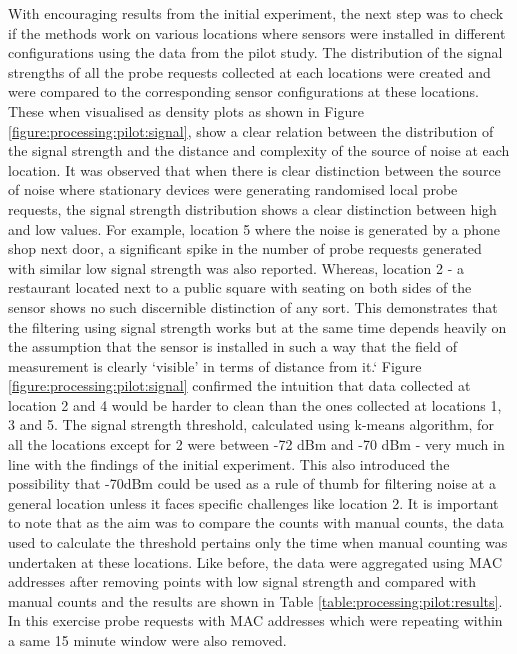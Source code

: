 With encouraging results from the initial experiment, the next step was to check if the methods work on various locations where sensors were installed in different configurations using the data from the pilot study.
The distribution of the signal strengths of all the probe requests collected at each locations were created and were compared to the corresponding sensor configurations at these locations.
These when visualised as density plots as shown in Figure \ref{figure:processing:pilot:signal}, show a clear relation between the distribution of the signal strength and the distance and complexity of the source of noise at each location.
It was observed that when there is clear distinction between the source of noise where stationary devices were generating randomised local probe requests, the signal strength distribution shows a clear distinction between high and low values.
For example, location 5 where the noise is generated by a phone shop next door, a significant spike in the number of probe requests generated with similar low signal strength was also reported.
Whereas, location 2 - a restaurant located next to a public square with seating on both sides of the sensor shows no such discernible distinction of any sort.
This demonstrates that the filtering using signal strength works but at the same time depends heavily on the assumption that the sensor is installed in such a way that the field of measurement is clearly `visible' in terms of distance from it.`
Figure \ref{figure:processing:pilot:signal} confirmed the intuition that data collected at location 2 and 4 would be harder to clean than the ones collected at locations 1, 3 and 5.
The signal strength threshold, calculated using k-means algorithm, for all the locations except for 2 were between -72 dBm and -70 dBm - very much in line with the findings of the initial experiment.
This also introduced the possibility that -70dBm could be used as a rule of thumb for filtering noise at a general location unless it faces specific challenges like location 2.
It is important to note that as the aim was to compare the counts with manual counts, the data used to calculate the threshold pertains only the time when manual counting was undertaken at these locations.
Like before, the data were aggregated using MAC addresses after removing points with low signal strength and compared with manual counts and the results are shown in Table \ref{table:processing:pilot:results}.
In this exercise probe requests with MAC addresses which were repeating within a same 15 minute window were also removed.

